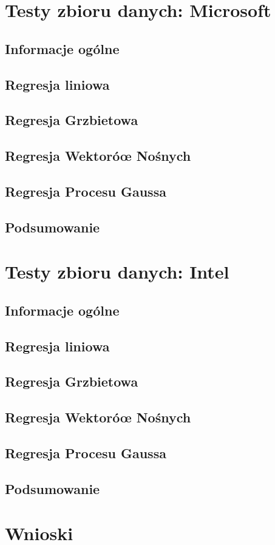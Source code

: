 \section{Testy zbioru danych: Microsoft}

\subsection{Informacje ogólne}
\subsection{Regresja liniowa}
\subsection{Regresja Grzbietowa}
\subsection{Regresja Wektoróœ Nośnych}
\subsection{Regresja Procesu Gaussa}
\subsection{Podsumowanie}

\section{Testy zbioru danych: Intel}

\subsection{Informacje ogólne}
\subsection{Regresja liniowa}
\subsection{Regresja Grzbietowa}
\subsection{Regresja Wektoróœ Nośnych}
\subsection{Regresja Procesu Gaussa}
\subsection{Podsumowanie}

\section{Wnioski}
